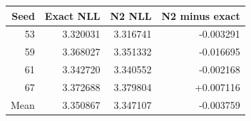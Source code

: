 \begin{tabular}{rrrr}
\toprule Seed & Exact NLL & N2 NLL & N2 minus exact\\\midrule
53 & 3.320031 & 3.316741 & -0.003291 \\
59 & 3.368027 & 3.351332 & -0.016695 \\
61 & 3.342720 & 3.340552 & -0.002168 \\
67 & 3.372688 & 3.379804 & +0.007116 \\
\midrule Mean & 3.350867 & 3.347107 & -0.003759 \\
\bottomrule\end{tabular}
